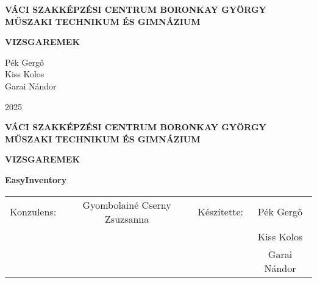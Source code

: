 \begin{titlepage}
	\begin{center}
		\textbf{VÁCI SZAKKÉPZÉSI CENTRUM BORONKAY GYÖRGY MŰSZAKI TECHNIKUM ÉS GIMNÁZIUM}

		\vfill

		{\fontsize{24}{24}\selectfont\textbf{VIZSGAREMEK}}

		\vfill

		Pék Gergő \\
		Kiss Kolos \\
		Garai Nándor

		2025
	\end{center}
\end{titlepage}

\thispagestyle{empty}
\begin{center}
	\textbf{VÁCI SZAKKÉPZÉSI CENTRUM BORONKAY GYÖRGY MŰSZAKI TECHNIKUM ÉS GIMNÁZIUM}

	\vfill

	

	{\fontsize{24}{24}\selectfont\textbf{VIZSGAREMEK}}

	\textbf{EasyInventory}

	\vfill

	\begin{tabular}{ c c c c }
		Konzulens: & Gyombolainé Cserny Zsuzsanna & Készítette: & Pék Gergő \\
		& & & Kiss Kolos \\
		& & & Garai Nándor
	\end{tabular}
\end{center}
\newpage
